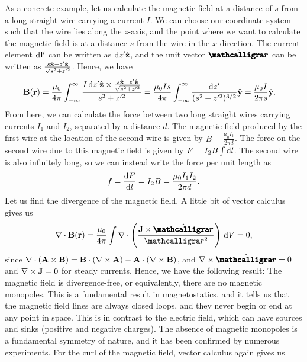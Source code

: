As a concrete example, let us calculate the magnetic field at a distance of $s$ from a long straight wire carrying a current $I$. We can choose our coordinate system such that the wire lies along the $z$-axis, and the point where we want to calculate the magnetic field is at a distance $s$ from the wire in the $x$-direction. The current element $\mathrm{d}\mathbf{l}'$ can be written as $\mathrm{d}z' \hat{\mathbf{z}}$, and the unit vector $\hat{\bcurs{r}}$ can be written as $\frac{s \hat{\mathbf{x}} - z' \hat{\mathbf{z}}}{\sqrt{s^2 + z'^2}}$. Hence, we have
\begin{align}
\mathbf{B}(\mathbf{r}) &= \frac{\mu_{0}}{4 \pi} \int_{-\infty}^{\infty} \frac{I \, \mathrm{d}z' \hat{\mathbf{z}} \times \frac{s \hat{\mathbf{x}} - z' \hat{\mathbf{z}}}{\sqrt{s^2 + z'^2}}}{s^2 + z'^2} = \frac{\mu_{0} I s}{4 \pi} \int_{-\infty}^{\infty} \frac{\mathrm{d}z'}{(s^2 + z'^2)^{3/2}} \hat{\mathbf{y}} = \frac{\mu_{0} I}{2 \pi s} \hat{\mathbf{y}}.
\end{align}
From here, we can calculate the force between two long straight wires carrying currents $I_{1}$ and $I_{2}$, separated by a distance $d$. The magnetic field produced by the first wire at the location of the second wire is given by $B = \frac{\mu_{0} I_{1}}{2 \pi d}$. The force on the second wire due to this magnetic field is given by $F = I_{2}B \int \mathrm{d}l$. The second wire is also infinitely long, so we can instead write the force per unit length as
\begin{align}
    f = \frac{\mathrm{d}F}{\mathrm{d}l} = I_{2}B = \frac{\mu_{0} I_{1} I_{2}}{2 \pi d}.
\end{align}
Let us find the divergence of the magnetic field. A little bit of vector calculus gives us
\begin{align}
    \nabla \cdot \bv{B}(\bv{r}) = \frac{\mu_{0}}{4 \pi} \int \nabla \cdot \left( \frac{\bv{J} \times \hat{\bcurs{r}}}{\curs{r}^{2}} \right) \, \di{V} = 0,
\end{align}
since $\nabla \cdot (\mathbf{A} \times \mathbf{B}) = \mathbf{B} \cdot (\nabla \times \mathbf{A}) - \mathbf{A} \cdot (\nabla \times \mathbf{B})$, and $\nabla \times \hat{\bcurs{r}} = 0$ and $\nabla \times \mathbf{J} = 0$ for steady currents. Hence, we have the following result: The magnetic field is divergence-free, or equivalently, there are no magnetic monopoles. This is a fundamental result in magnetostatics, and it tells us that the magnetic field lines are always closed loops, and they never begin or end at any point in space. This is in contrast to the electric field, which can have sources and sinks (positive and negative charges). The absence of magnetic monopoles is a fundamental symmetry of nature, and it has been confirmed by numerous experiments. For the curl of the magnetic field, vector calculus again gives us
